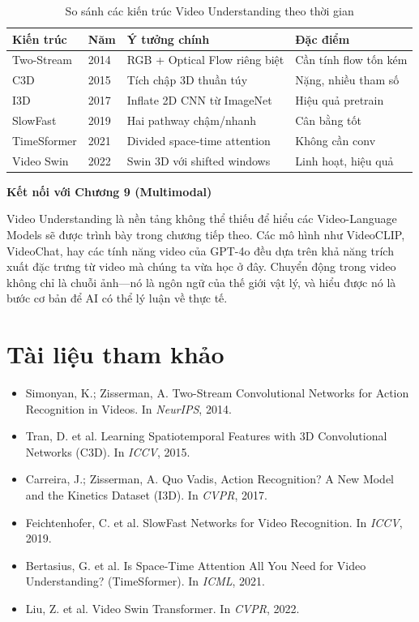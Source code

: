 \begin{table}[h!]
    \centering
    \caption{So sánh các kiến trúc Video Understanding theo thời gian}
    \label{tab:video_arch_comparison}
    \begin{tabular}{|l|l|p{4.5cm}|l|}
        \hline
        \textbf{Kiến trúc} & \textbf{Năm} & \textbf{Ý tưởng chính} & \textbf{Đặc điểm} \\
        \hline
        Two-Stream & 2014 & RGB + Optical Flow riêng biệt & Cần tính flow tốn kém \\
        C3D & 2015 & Tích chập 3D thuần túy & Nặng, nhiều tham số \\
        I3D & 2017 & Inflate 2D CNN từ ImageNet & Hiệu quả pretrain \\
        SlowFast & 2019 & Hai pathway chậm/nhanh & Cân bằng tốt \\
        TimeSformer & 2021 & Divided space-time attention & Không cần conv \\
        Video Swin & 2022 & Swin 3D với shifted windows & Linh hoạt, hiệu quả \\
        \hline
    \end{tabular}
\end{table}

\begin{mdframed}[style=infobox]
    \textbf{Kết nối với Chương 9 (Multimodal)}

    Video Understanding là nền tảng không thể thiếu để hiểu các Video-Language Models sẽ được trình bày trong chương tiếp theo. Các mô hình như VideoCLIP, VideoChat, hay các tính năng video của GPT-4o đều dựa trên khả năng trích xuất đặc trưng từ video mà chúng ta vừa học ở đây. Chuyển động trong video không chỉ là chuỗi ảnh—nó là ngôn ngữ của thế giới vật lý, và hiểu được nó là bước cơ bản để AI có thể lý luận về thực tế.
\end{mdframed}

\section*{Tài liệu tham khảo}
\begin{itemize}
    \item[1] Simonyan, K.; Zisserman, A. Two-Stream Convolutional Networks for Action Recognition in Videos. In \textit{NeurIPS}, 2014.
    \item[2] Tran, D. et al. Learning Spatiotemporal Features with 3D Convolutional Networks (C3D). In \textit{ICCV}, 2015.
    \item[3] Carreira, J.; Zisserman, A. Quo Vadis, Action Recognition? A New Model and the Kinetics Dataset (I3D). In \textit{CVPR}, 2017.
    \item[4] Feichtenhofer, C. et al. SlowFast Networks for Video Recognition. In \textit{ICCV}, 2019.
    \item[5] Bertasius, G. et al. Is Space-Time Attention All You Need for Video Understanding? (TimeSformer). In \textit{ICML}, 2021.
    \item[6] Liu, Z. et al. Video Swin Transformer. In \textit{CVPR}, 2022.
\end{itemize}
